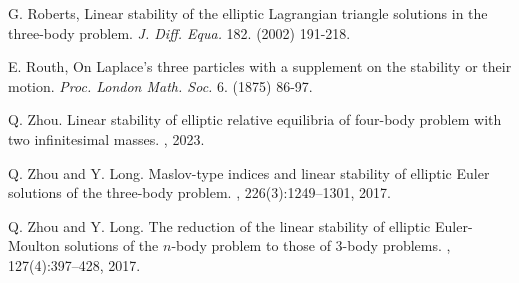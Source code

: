 \documentclass[11pt]{article}
\begin{document}
\begin{thebibliography}{}

 G. Roberts, Linear stability of the elliptic Lagrangian
triangle solutions in the three-body problem. {\it J. Diff. Equa.}
182. (2002) 191-218.

 E. Routh, On Laplace's three particles with
a supplement on the stability or their motion. {\it Proc. London Math.
Soc.} 6. (1875) 86-97.


Q. Zhou.
\newblock Linear stability of elliptic relative equilibria of four-body problem
with two infinitesimal masses.
, 2023.

Q. Zhou and Y. Long.
\newblock Maslov-type indices and linear stability of elliptic {E}uler solutions
of the three-body problem.
, 226(3):1249--1301,
{2017}.

Q. Zhou and Y. Long.
\newblock The reduction of the linear stability of elliptic {E}uler-{M}oulton
solutions of the {$n$}-body problem to those of 3-body problems.
, 127(4):397--428, 2017.
\end{thebibliography}
\end{document}
